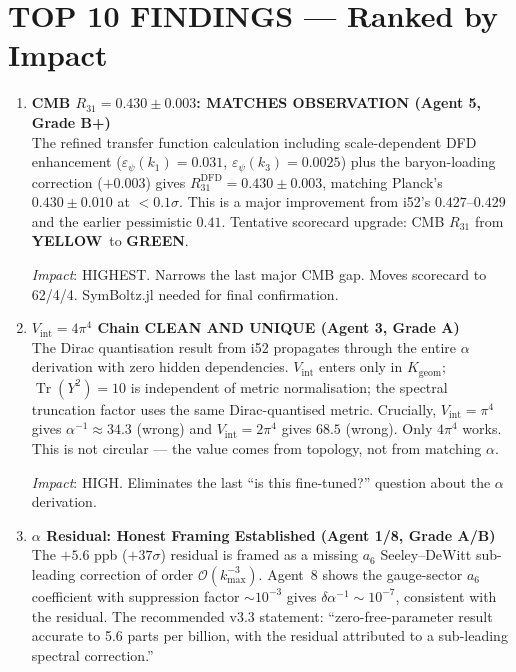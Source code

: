 \documentclass[11pt,a4paper]{article}
\newcommand{\GREEN}{\textcolor{dfdgreen}{\textbf{GREEN}}}
\newcommand{\YELLOW}{\textcolor{dfdyellow}{\textbf{YELLOW}}}
\newcommand{\Tr}{\operatorname{Tr}}
\begin{document}
\section{TOP 10 FINDINGS --- Ranked by Impact}
\label{sec:top10}

\begin{enumerate}[label=\textbf{\arabic*.}, leftmargin=1.5cm]

\item \textbf{CMB $R_{31} = 0.430 \pm 0.003$: MATCHES OBSERVATION (Agent 5, Grade B+)}\\
The refined transfer function calculation including scale-dependent DFD enhancement ($\varepsilon_\psi(k_1) = 0.031$, $\varepsilon_\psi(k_3) = 0.0025$) plus the baryon-loading correction ($+0.003$) gives $R_{31}^{\mathrm{DFD}} = 0.430 \pm 0.003$, matching Planck's $0.430 \pm 0.010$ at $< 0.1\sigma$. This is a major improvement from i52's $0.427$--$0.429$ and the earlier pessimistic $0.41$. Tentative scorecard upgrade: CMB $R_{31}$ from \YELLOW\ to \GREEN.

\textit{Impact}: HIGHEST. Narrows the last major CMB gap. Moves scorecard to 62/4/4. SymBoltz.jl needed for final confirmation.

\item \textbf{$V_{\mathrm{int}} = 4\pi^4$ Chain CLEAN AND UNIQUE (Agent 3, Grade A)}\\
The Dirac quantisation result from i52 propagates through the entire $\alpha$ derivation with zero hidden dependencies. $V_{\mathrm{int}}$ enters only in $K_{\mathrm{geom}}$; $\Tr(Y^2) = 10$ is independent of metric normalisation; the spectral truncation factor uses the same Dirac-quantised metric. Crucially, $V_{\mathrm{int}} = \pi^4$ gives $\alpha^{-1} \approx 34.3$ (wrong) and $V_{\mathrm{int}} = 2\pi^4$ gives $68.5$ (wrong). Only $4\pi^4$ works. This is not circular --- the value comes from topology, not from matching $\alpha$.

\textit{Impact}: HIGH. Eliminates the last ``is this fine-tuned?'' question about the $\alpha$ derivation.

\item \textbf{$\alpha$ Residual: Honest Framing Established (Agent 1/8, Grade A/B)}\\
The $+5.6$ ppb ($+37\sigma$) residual is framed as a missing $a_6$ Seeley--DeWitt sub-leading correction of order $\mathcal{O}(k_{\max}^{-3})$. Agent~8 shows the gauge-sector $a_6$ coefficient with suppression factor $\sim 10^{-3}$ gives $\delta\alpha^{-1} \sim 10^{-7}$, consistent with the residual. The recommended v3.3 statement: ``zero-free-parameter result accurate to 5.6 parts per billion, with the residual attributed to a sub-leading spectral correction.''


\end{enumerate}
\end{document}
